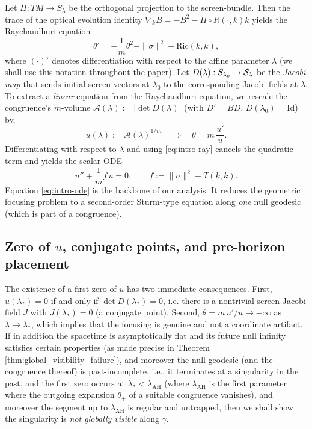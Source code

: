 \documentclass[a4paper, reqno]{amsart}
\numberwithin{equation}{section}
\theoremstyle{plain}
\theoremstyle{definition}
\theoremstyle{remark}
\newcommand{\Id}{\mathrm{Id}}
\newcommand{\lam}{\lambda}
\newcommand{\lamo}{\lambda_0}
\begin{document}
Let $\Pi:TM\to S_{\lambda}$ be the orthogonal projection to the screen-bundle. Then the trace of the optical evolution identity $\nabla_{k}B=-B^2-\Pi\circ R(\cdot,k)k$ yields the Raychaudhuri equation
\begin{equation}\label{eq:intro-ray}
\theta'=-\frac{1}{m}\theta^2-\|\sigma\|^2-\mathrm{Ric}(k,k), 
\end{equation}
where $(\cdot)'$ denotes differentiation with respect to the affine parameter $\lambda$ (we shall use this notation throughout the paper). Let $D(\lam):\mathcal \mathcal S_{\lamo}\to \mathcal S_\lam$ be the \emph{Jacobi map} that sends initial screen vectors at $\lamo$ to the corresponding Jacobi fields at $\lam$. To extract a \emph{linear} equation from the Raychaudhuri equation, we rescale the congruence’s $m$-volume $\mathcal A(\lambda):=|\det D(\lambda)|$ (with $D' = B D$, $D(\lambda_0)=\Id$) by,
$$\displaystyle u(\lambda):=\mathcal A(\lambda)^{1/m}\quad\Longrightarrow\quad \theta=m\,\frac{u'}{u}.$$
Differentiating with respect to $\lambda$ and using \eqref{eq:intro-ray} cancels the quadratic term and yields the scalar ODE
\begin{equation}\label{eq:intro-ode}
u''+\frac{1}{m}f\,u=0,\qquad f:=\|\sigma\|^2+T(k,k).
\end{equation}
Equation \eqref{eq:intro-ode} is the backbone of our analysis. It reduces the geometric focusing problem to a second-order Sturm-type equation along \emph{one} null geodesic (which is part of a congruence).

\subsection{Zero of \(u\), conjugate points, and pre-horizon placement}
The existence of a first zero of $u$ has two immediate consequences. First, $u(\lambda_*)=0$ if and only if $\det D(\lambda_*)=0$, i.e. there is a nontrivial screen Jacobi field $J$ with $J(\lambda_*)=0$ (a conjugate point). Second, $\theta=m\,u'/u\to -\infty$ as $\lambda\to\lambda_*$, which implies that the focusing is genuine and not a coordinate artifact. If in addition the spacetime is asymptotically flat and its future null infinity satisfies certain properties (as made precise in Theorem \ref{thm:global_visibility_failure}), and moreover the null geodesic (and the congruence thereof) is past-incomplete, i.e., it terminates at a singularity in the past, and the first zero occurs at $\lambda_*<\lambda_{\mathrm{AH}}$ (where $\lambda_{\mathrm{AH}}$ is the first parameter where the outgoing expansion $\theta_+$ of a suitable congruence vanishes), and moreover the segment up to $\lambda_{\mathrm{AH}}$ is regular and untrapped, then we shall show  the singularity is \emph{not globally visible} along $\gamma$. 
\end{document}
